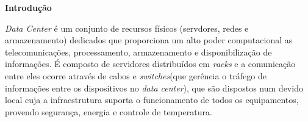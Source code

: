 \documentclass[a4paper,12pt]{article}
\begin{document}
\begin{center}
\textbf{{\LARGE Introdução}} \\ \vspace{0.5cm}
\end{center}

\textit{Data Center} é um conjunto de recursos físicos (servdores, redes e armazenamento) dedicados que proporciona um alto poder computacional as telecomunicações, processamento, armazenamento e disponibilização de informações. É composto de servidores distribuídos em \textit{racks} e a comunicação entre eles ocorre através de cabos e \textit{switches}(que gerência o tráfego de informações entre os dispositivos no \textit{data center}), que são dispostos num devido local cuja a infraestrutura suporta o funcionamento de todos os equipamentos, provendo segurança, energia e controle de temperatura.
\end{document}
